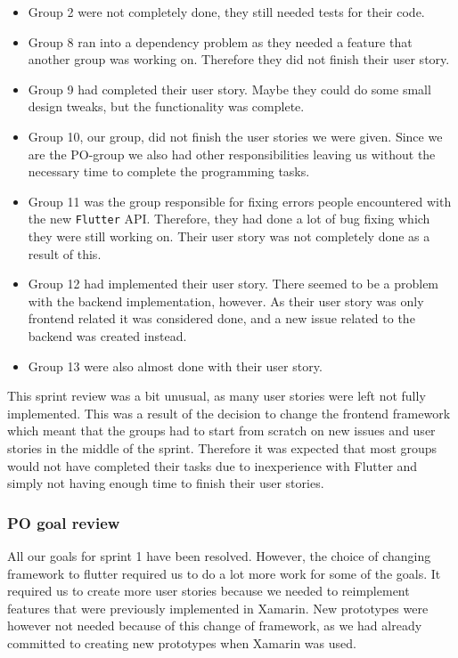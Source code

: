 \begin{itemize}
    \item Group 2 were not completely done, they still needed tests for their code.
    \item Group 8 ran into a dependency problem as they needed a feature that another group was working on. Therefore they did not finish their user story.
    \item Group 9 had completed their user story. Maybe they could do some small design tweaks, but the functionality was complete.
    \item Group 10, our group, did not finish the user stories we were given. Since we are the PO-group we also had other responsibilities leaving us without the necessary time to complete the programming tasks.
    \item Group 11 was the group responsible for fixing errors people encountered with the new \texttt{Flutter} API. Therefore, they had done a lot of bug fixing which they were still working on. Their user story was not completely done as a result of this.
    \item Group 12 had implemented their user story. There seemed to be a problem with the backend implementation, however. As their user story was only frontend related it was considered done, and a new issue related to the backend was created instead.
    \item Group 13 were also almost done with their user story.
\end{itemize}
\noindent
This sprint review was a bit unusual, as many user stories were left not fully implemented. This was a result of the decision to change the frontend framework which meant that the groups had to start from scratch on new issues and user stories in the middle of the sprint.
Therefore it was expected that most groups would not have completed their tasks due to inexperience with Flutter and simply not having enough time to finish their user stories.

\subsubsection{PO goal review}
All our goals for sprint 1 have been resolved. 
However, the choice of changing framework to flutter required us to do a lot more work for some of the goals.
It required us to create more user stories because we needed to reimplement features that were previously implemented in Xamarin.
New prototypes were however not needed because of this change of framework, as we had already committed to creating new prototypes when Xamarin was used.

